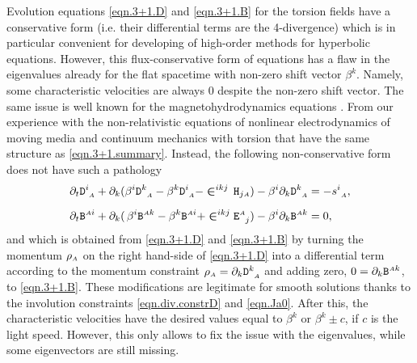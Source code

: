 \documentclass[
10pt, %
a4paper, %
oneside, %
headinclude,footinclude, %
BCOR5mm, %
]{scrartcl}
\newcommand{\sA}{\mathsmaller A}
\newcommand{\pd}[1]{\partial_{#1}}
\newcommand{\stress}[2]{s_{\ #1}^{#2}}
\newcommand{\Dfin}[2]{\mathtt{D}_{\phantom{#2}#1}^{#2}}	%
\newcommand{\Hfin}[2]{\mathtt{H}_{#2#1}}	%
\newcommand{\Efin}[2]{\mathtt{E}^{#1}_{\phantom{#1}#2}}	%
\newcommand{\Bfin}[2]{\mathtt{B}^{#1#2}}	%
\newcommand{\LCsymb}{\bm{\in}}    %
\newcommand{\shift}[1]{\beta^{#1}}
\begin{document}
Evolution equations \eqref{eqn.3+1.D} and \eqref{eqn.3+1.B} for the torsion fields have a 
conservative form (i.e. their differential 
terms are the 4-divergence) which is in particular convenient for developing of high-order methods 
for hyperbolic equations.
However, this flux-conservative form of equations has a flaw in the eigenvalues already for the 
flat spacetime with non-zero shift vector $ \shift{k} $. Namely, some characteristic velocities are 
always 0 despite the non-zero shift vector. The same issue is well known for the 
magnetohydrodynamics 
equations \cite{Powell1999}. From our experience with the non-relativistic equations 
of nonlinear electrodynamics of 
moving media \cite{DPRZ2017} and continuum mechanics with torsion \cite{Torsion2019} that have the 
same structure as \eqref{eqn.3+1.summary}. 
Instead, the following non-conservative form does not have 
such a pathology
\begin{subequations}\label{eqn.BD.alt}
	\begin{align}
		\pd{t} \Dfin{\sA}{i} + \pd{k}(\shift{i} 
		\Dfin{\sA}{k} - \shift{k}\Dfin{\sA}{i}  - \LCsymb^{ikj} \,
		\Hfin{\sA}{j}) 
		-\shift{i}\pd{k} \Dfin{\sA}{k}
		& 
		= - \stress{\sA}{i},
		\label{eqn.BD.alt.D}
		\\[2mm]
		\pd{t} \Bfin{\sA}{i} + \pd{k}(\,\shift{i} 
		\Bfin{\sA}{k} - \shift{k}\Bfin{\sA}{i}  + \LCsymb^{ikj} 
		\Efin{\sA}{j}) 
		-\shift{i}\pd{k} \Bfin{\sA}{k}
		& 
		= 0,
		\label{eqn.BD.alt.B}
	\end{align}
\end{subequations}
and which is obtained from \eqref{eqn.3+1.D} and \eqref{eqn.3+1.B} by turning the momentum $ \rho_\sA 
$ on the right hand-side of \eqref{eqn.3+1.D} into a differential term according to the momentum 
constraint $ 
\rho_\sA = \pd{k}\Dfin{\sA}{k} $ and adding zero, $ 0 = \pd{k}\Bfin{\sA}{k} $, to 
\eqref{eqn.3+1.B}. These modifications are legitimate for smooth solutions thanks to the involution 
constraints \eqref{eqn.div.constrD} and \eqref{eqn.Ja0}. After this, the characteristic velocities 
have the desired values equal to $ \shift{k} $ or $ \shift{k} \pm c $, if $ c $ is the light 
speed. 
However, this only allows to fix the issue with the eigenvalues, while some eigenvectors are still 
missing.
\end{document}
